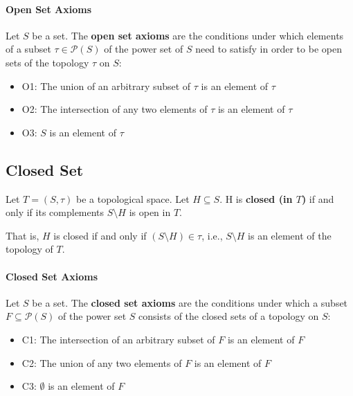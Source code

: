 \paragraph{Open Set Axioms}
\label{sec:open-set-axioms}

Let $S$ be a set. The \textbf{open set axioms} are the conditions
under which elements of a subset $\tau \in \mathcal{P}(S)$ of the
power set of $S$ need to satisfy in order to be open sets of the
topology $\tau$ on $S$:

\begin{itemize}
\item O1: The union of an arbitrary subset of $\tau$ is an element of
$\tau$
\item O2: The intersection of any two elements of $\tau$ is an element
of $\tau$
\item O3: $S$ is an element of $\tau$
\end{itemize}



\subsection{Closed Set}
\label{sec:closed-set}

Let $T = (S, \tau)$ be a topological space. Let $H \subseteq S$. H is
\textbf{closed (in $T$)} if and only if its complements
$S \setminus H$ is open in $T$.

That is, $H$ is closed if and only if $(S \setminus H) \in \tau$,
i.e., $S \setminus H$ is an element of the topology of $T$.


\paragraph{Closed Set Axioms}

Let $S$ be a set. The \textbf{closed set axioms} are the conditions
under which a subset $F \subseteq \mathcal{P}(S)$ of the power set $S$
consists of the closed sets of a topology on $S$:

\begin{itemize}
\item C1: The intersection of an arbitrary subset of $F$ is an element
  of $F$
\item C2: The union of any two elements of $F$ is an element of $F$
\item C3: $\emptyset$ is an element of $F$
\end{itemize}



